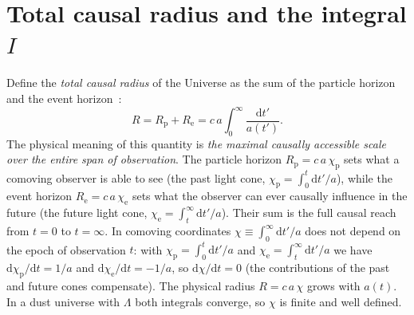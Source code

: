 \documentclass[10pt,a4paper]{article}
\begin{document}
\section{Total causal radius and the integral \texorpdfstring{$I$}{I}}

Define the \emph{total causal radius} of the Universe as the sum of the particle horizon and the event horizon~\cite{Davis2004}:
\begin{equation}
R = R_{\mathrm{p}} + R_{\mathrm{e}} = c\,a\int_0^{\infty}\frac{\mathrm{d}t'}{a(t')}.
\end{equation}
The physical meaning of this quantity is \emph{the maximal causally accessible scale over the entire span of observation}. The particle horizon $R_{\mathrm{p}}=c\,a\,\chi_{\mathrm{p}}$ sets what a comoving observer is able to see (the past light cone, $\chi_{\mathrm{p}}=\int_0^{t}\mathrm{d}t'/a$), while the event horizon $R_{\mathrm{e}}=c\,a\,\chi_{\mathrm{e}}$ sets what the observer can ever causally influence in the future (the future light cone, $\chi_{\mathrm{e}}=\int_t^{\infty}\mathrm{d}t'/a$). Their sum is the full causal reach from $t=0$ to $t=\infty$. In comoving coordinates $\chi\equiv\int_0^{\infty}\mathrm{d}t'/a$ does not depend on the epoch of observation $t$: with $\chi_{\mathrm{p}}=\int_0^{t}\mathrm{d}t'/a$ and $\chi_{\mathrm{e}}=\int_t^{\infty}\mathrm{d}t'/a$ we have $\mathrm{d}\chi_{\mathrm{p}}/\mathrm{d}t=1/a$ and $\mathrm{d}\chi_{\mathrm{e}}/\mathrm{d}t=-1/a$, so $\mathrm{d}\chi/\mathrm{d}t=0$ (the contributions of the past and future cones compensate). The physical radius $R=c\,a\,\chi$ grows with $a(t)$. In a dust universe with $\Lambda$ both integrals converge, so $\chi$ is finite and well defined.
\end{document}
